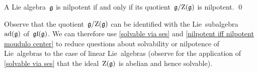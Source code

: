 \begin{corollary}
  \label{nilpotent iff nilpotent moudulo center}
  A Lie algebra~$\mathfrak{g}$ is nilpotent if and only if its quotient~$\mathfrak{g}/{\operatorname{Z}(\mathfrak{g})}$ is nilpotent.
  \qed
\end{corollary}


\begin{remark}
  Observe that the quotient~$\mathfrak{g}/{\operatorname{Z}(\mathfrak{g})}$ can be identified with the Lie~subalgebra~$\operatorname{ad}(\mathfrak{g})$ of~$\mathfrak{gl}(\mathfrak{g})$.
  We can therefore use \cref{solvable via ses} and \cref{nilpotent iff nilpotent moudulo center} to reduce questions about solvability or nilpotence of Lie~algebras to the case of linear Lie~algebras (observe for the application of \cref{solvable via ses} that the ideal~$\operatorname{Z}(\mathfrak{g})$ is abelian and hence solvable).
\end{remark}


